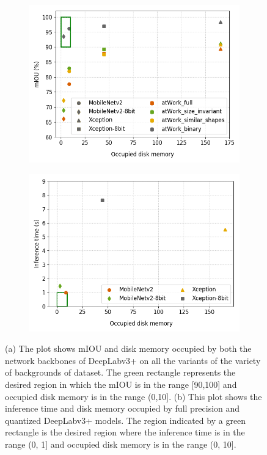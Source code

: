 	\begin{figure}
		\begin{subfigure}{.5\textwidth}
			\centering
			\includegraphics[width=1\linewidth]{images/quant}
			\caption{}
			\label{Fig:quantb}
		\end{subfigure}
		\begin{subfigure}{.5\textwidth}
			\centering
			\includegraphics[width=1\linewidth]{images/quant_time}
			\caption{}
			\label{Fig:quanta}
		\end{subfigure}
		\caption{(a) The plot shows mIOU and disk memory occupied by both the network backbones of DeepLabv3+ on all the variants of the variety of backgrounds of dataset. The green rectangle represents the desired region in which the mIOU is in the range [90,100] and occupied disk memory is in the range (0,10]. (b) This plot shows the inference time and disk memory occupied by full precision and quantized DeepLabv3+ models. The region indicated by a green rectangle is the desired region where the inference time is in the range (0, 1] and occupied disk memory is in the range (0, 10].}
		\label{Fig:quant}
	\end{figure}
	
